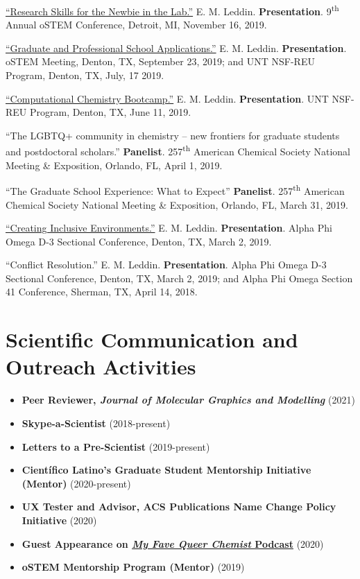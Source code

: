\documentclass[letterpaper,11pt]{article}
\newcommand{\resumeItem}[2]{
  \item\small{
    \textbf{#1}{ #2 \vspace{-2pt}}
  }
}
\newcommand{\resumeSubItem}[2]{\resumeItem{#1}{#2}\vspace{-4pt}}
\newcommand{\resumeSubHeadingListStart}{\begin{itemize}[leftmargin=*]}
\newcommand{\resumeSubHeadingListEnd}{\end{itemize}}
\begin{document}
\begin{etaremune}[start=14]
{  \item \textnormal{\href{http://bit.ly/2019-oSTEM-PROF10}{``Research Skills for the Newbie in the Lab.''} E. M. Leddin. \textbf{Presentation}. 9\textsuperscript{th} Annual oSTEM Conference, Detroit, MI, November 16, 2019.}
\item \textnormal{\href{https://www.youtube.com/watch?v=6VkSUhsZr40&feature=youtu.be}{``Graduate and Professional School Applications.''} E. M. Leddin. \textbf{Presentation}. oSTEM Meeting, Denton, TX, September 23, 2019; and UNT NSF-REU Program, Denton, TX, July, 17 2019.}
  \item \textnormal{\href{http://bit.ly/2019-UNTREU-CCBC}{``Computational Chemistry Bootcamp.''} E. M. Leddin. \textbf{Presentation}. UNT NSF-REU Program, Denton, TX, June 11, 2019.}
  \item \textnormal{``The LGBTQ+ community in chemistry -- new frontiers for graduate students and postdoctoral scholars.'' \textbf{Panelist}. 257\textsuperscript{th} American Chemical Society National Meeting \& Exposition, Orlando, FL, April 1, 2019.}
  \item \textnormal{``The Graduate School Experience: What to Expect'' \textbf{Panelist}. 257\textsuperscript{th} American Chemical Society National Meeting \& Exposition, Orlando, FL, March 31, 2019.}
  \item \textnormal{ \href{https://docs.google.com/presentation/d/1mKDUxe-elMQ7EkTBglIQBeZlcsdBwmfP5loLxAsshF0/edit}{``Creating Inclusive Environments.''} E. M. Leddin. \textbf{Presentation}. Alpha Phi Omega D-3 Sectional Conference, Denton, TX, March 2, 2019.}
  \item \textnormal{``Conflict Resolution.'' E. M. Leddin. \textbf{Presentation}. Alpha Phi Omega D-3 Sectional Conference, Denton, TX, March 2, 2019; and Alpha Phi Omega Section 41 Conference, Sherman, TX, April 14, 2018.}
  }
\end{etaremune}

\section{Scientific Communication and Outreach Activities}
  \resumeSubHeadingListStart
    \resumeSubItem{Peer Reviewer, \emph{Journal of Molecular Graphics and Modelling}}
      {(2021)}
   \resumeSubItem{Skype-a-Scientist}
      {(2018-present)}
    \resumeSubItem{Letters to a Pre-Scientist}
      {(2019-present)}
    \resumeSubItem{Cient\'{i}fico Latino's Graduate Student Mentorship Initiative (Mentor)}
      {(2020-present)}
    \resumeSubItem{UX Tester and Advisor, ACS Publications Name Change Policy Initiative}
      {(2020)}
    \resumeSubItem{Guest Appearance on \href{https://www.stitcher.com/show/my-fave-queer-chemist/episode/emmett-leddin-university-of-north-texas-69219314}{\emph{My Fave Queer Chemist} Podcast}}
      {(2020)}
    \resumeSubItem{oSTEM Mentorship Program (Mentor)}
      {(2019)}
  \resumeSubHeadingListEnd
\end{document}

